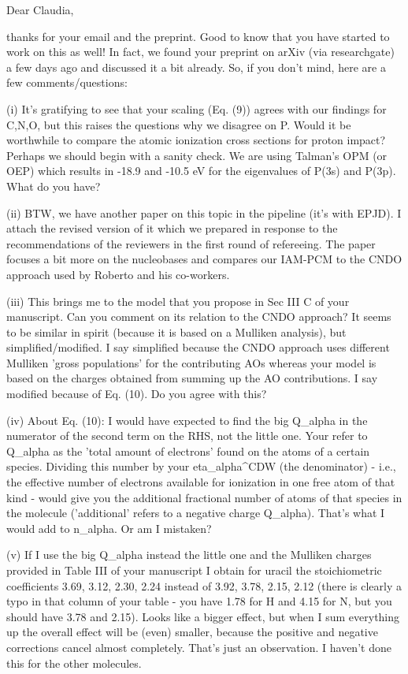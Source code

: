 Dear Claudia,

thanks for your email and the preprint. Good to know that you have
started to work on this as well! In fact, we found your preprint on
arXiv (via researchgate) a few days ago and discussed it a bit already.
So, if you don't mind, here are a few comments/questions:

(i) It's gratifying to see that your scaling (Eq. (9)) agrees with our
findings for C,N,O, but this raises the questions why we disagree on P.
Would it be worthwhile to compare the atomic ionization cross sections
for proton impact? Perhaps we should begin with a sanity check. We are
using Talman's OPM (or OEP) which results in -18.9 and -10.5 eV for the
eigenvalues of P(3s) and P(3p). What do you have?

(ii) BTW, we have another paper on this topic in the pipeline (it's with
EPJD). I attach the revised version of it which we prepared in response
to the recommendations of the reviewers in the first round of
refereeing. The paper focuses a bit more on the nucleobases and compares
our IAM-PCM to the CNDO approach used by Roberto and his co-workers.

(iii) This brings me to the model that you propose in Sec III C of your
manuscript. Can you comment on its relation to the CNDO approach? It
seems to be similar in spirit (because it is based on a Mulliken
analysis), but simplified/modified. I say simplified because the CNDO
approach uses different Mulliken 'gross populations' for the
contributing AOs whereas your model is based on the charges obtained
from summing up the AO contributions. I say modified because of Eq.
(10). Do you agree with this?

(iv) About Eq. (10): I would have expected to find the big Q_alpha in
the numerator of the second term on the RHS, not the little one. Your
refer to Q_alpha as the 'total amount of electrons' found on the atoms
of a certain species. Dividing this number by your eta_alpha^CDW (the
denominator) - i.e., the effective number of electrons available for
ionization in one free atom of that kind - would give you the additional
fractional number of atoms of that species in the molecule ('additional'
refers to a negative charge Q_alpha). That's what I would add to
n_alpha. Or am I mistaken?

(v) If I use the big Q_alpha instead the little one and the Mulliken
charges provided in Table III of your manuscript I obtain for uracil the
stoichiometric coefficients 3.69, 3.12, 2.30, 2.24 instead of 3.92,
3.78, 2.15, 2.12 (there is clearly a typo in that column of your table -
you have 1.78 for H and 4.15 for N, but you should have 3.78 and 2.15).
Looks like a bigger effect, but when I sum everything up the overall
effect will be (even) smaller, because the positive and negative
corrections cancel almost completely. That's just an observation. I
haven't done this for the other molecules.

